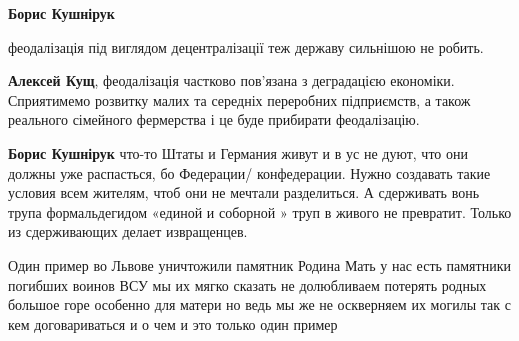 \begin{itemize}
\begin{itemize}
 
\textbf{Борис Кушнірук} 

феодалізація під виглядом децентралізації теж державу сильнішою не робить.

 
\textbf{Алексей Кущ}, феодалізація частково пов'язана з деградацією економіки.
Сприятимемо розвитку малих та середніх переробних підприємств, а також
реального сімейного фермерства і це буде прибирати феодалізацію.


 
\textbf{Борис Кушнірук} что-то Штаты и Германия живут и в ус не дуют, что они
должны уже распасться, бо Федерации/ конфедерации. Нужно создавать такие
условия всем жителям, чтоб они не мечтали разделиться. А сдерживать вонь трупа
формальдегидом «единой и соборной » труп в живого не превратит. Только из
сдерживающих делает извращенцев.

\end{itemize}

 

Один пример во Львове уничтожили памятник Родина Мать у нас есть памятники
погибших воинов ВСУ мы их мягко сказать не долюбливаем потерять родных большое
горе особенно для матери но ведь мы же не оскверняем их могилы так с кем
договариваться и о чем и это только один пример

\begin{itemize}
 

\end{itemize}
\end{itemize}

